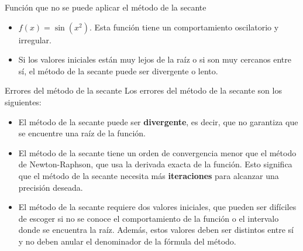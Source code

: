 \documentclass{beamer}
\begin{document}
\begin{frame}{Función que no se puede aplicar el método de la secante}
\begin{itemize}
\item $f(x)=\sin(x^2)$. Esta función tiene un comportamiento oscilatorio y irregular.

\item Si los valores iniciales están muy lejos de la raíz o si son muy cercanos entre sí, el método de la secante puede ser divergente o lento. 
  
\end{itemize}
    \begin{center}
  \end{center}

\end{frame}






\begin{frame}{Errores del método de la secante}
  Los errores del método de la secante son los siguientes:  
  \begin{itemize}
    \item El método de la secante puede ser \textbf{divergente}, es decir, que no garantiza que se encuentre una raíz de la función.
    
    \item El método de la secante tiene un orden de convergencia menor que el método de Newton-Raphson, que usa la derivada exacta de la función. Esto significa que el método de la secante necesita más \textbf{iteraciones} para alcanzar una precisión deseada.
    
    \item El método de la secante requiere dos valores iniciales, que pueden ser difíciles de escoger si no se conoce el comportamiento de la función o el intervalo donde se encuentra la raíz. Además, estos valores deben ser distintos entre sí y no deben anular el denominador de la fórmula del método.
  \end{itemize}
\end{frame}
\end{document}
